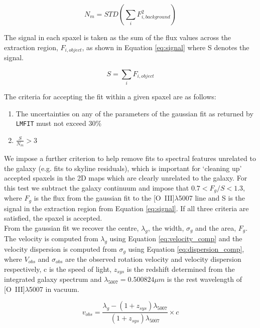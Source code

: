 \documentclass[fleqn,usenatbib]{mn2e}
\begin{document}
\begin{equation}\label{eq:noise}
    N_{m} = STD\left(\sum_{i}F_{i,background}^{2}\right)
\end{equation}

The signal in each spaxel is taken as the sum of the flux values across the extraction region, $F_{i,object}$, as shown in Equation \ref{eq:signal} where S denotes the signal.

\begin{equation}\label{eq:signal}
    S = \sum_{i}F_{i,object}
\end{equation}

The criteria for accepting the fit within a given spaxel are as follows:

\begin{enumerate}
\item The uncertainties on any of the parameters of the gaussian fit as returned by {\tt LMFIT} must not exceed 30\%
\item $\frac{S}{N_{m}} > 3$
\end{enumerate}

We impose a further criterion to help remove fits to spectral features unrelated to the galaxy (e.g. fits to skyline residuals), which is important for `cleaning up' accepted spaxels in the 2D maps which are clearly unrelated to the galaxy. For this test we subtract the galaxy continuum and impose that $0.7 < F_{g}/{S} < 1.3$, where $F_{g}$ is the flux from the gaussian fit to the [O~{\sc III}]$\lambda$5007 line and S is the signal in the extraction region from Equation \ref{eq:signal}. If all three criteria are satisfied, the spaxel is accepted. \\

From the gaussian fit we recover the centre, $\lambda_{g}$, the width, $\sigma_{g}$ and the area, $F_{g}$.
The velocity is computed from $\lambda_{g}$ using Equation \ref{eq:velocity_comp} and the velocity dispersion is computed from $\sigma_{g}$ using Equation \ref{eq:dispersion_comp}, where $V_{obs}$ and $\sigma_{obs}$ are the observed rotation velocity and velocity dispersion respectively, c is the speed of light, $z_{sys}$ is the redshift determined from the integrated galaxy spectrum and $\lambda_{5007} = 0.500824\mu m$ is the rest wavelength of [O~{\sc III}]$\lambda$5007 in vacuum.

\begin{equation}\label{eq:velocity_comp}
   v_{obs} = \frac{\lambda_{g} - (1 + z_{sys})\lambda_{5007}}{(1 + z_{sys})\lambda_{5007}} \times c
\end{equation}
\end{document}
